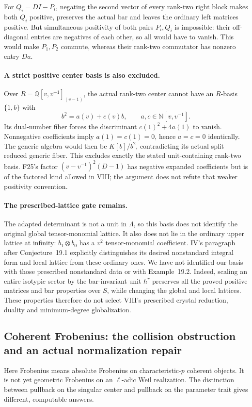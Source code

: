 \documentclass[11pt,a4paper]{article}
\newcommand{\Q}{\mathbb Q}\newcommand{\Z}{\mathbb Z}\newcommand{\C}{\mathbb C}\newcommand{\N}{\mathbb N}\newcommand{\F}{\mathbb F}
\theoremstyle{named}\newtheorem{finding}{Finding}[section]
\theoremstyle{definition}\newtheorem{definition}[finding]{Definition}
\theoremstyle{remark}\newtheorem{remark}[finding]{Remark}
\begin{document}
For $Q_i=DI-P_i$, negating the second vector of every rank-two
right block makes both $Q_i$ positive, preserves the actual bar
and leaves the ordinary left matrices positive.
But simultaneous positivity of both pairs $P_i,Q_i$ is impossible:
their off-diagonal entries are negatives of each other, so all
would have to vanish. This would make $P_1,P_2$ commute, whereas
their rank-two commutator has nonzero entry $Da$.

\paragraph{A strict positive center basis is also excluded.}
Over $R=\Q[v,v^{-1}]_{(v-1)}$, the actual rank-two center cannot
have an $R$-basis $\{1,b\}$ with
\[
 b^2=a(v)+c(v)b,\qquad a,c\in\N[v,v^{-1}].
\]
Its dual-number fiber forces the discriminant
$c(1)^2+4a(1)$ to vanish. Nonnegative coefficients imply
$a(1)=c(1)=0$, hence $a=c=0$ identically.
The generic algebra would then be $K[b]/b^2$, contradicting its
actual split reduced generic fiber. This excludes exactly the
stated unit-containing rank-two basis. F25's factor
$(v-v^{-1})^2(D-1)$ has negative expanded coefficients but is of
the factored kind allowed in VIII; the argument does not refute
that weaker positivity convention.

\paragraph{The prescribed-lattice gate remains.}
The adapted determinant is not a unit in $\Lambda$, so this basis
does not identify the original global tensor-monomial lattice.
It also does not lie in the ordinary upper lattice at infinity:
$b_1\otimes b_0$ has a $v^2$ tensor-monomial coefficient.
IV's paragraph after Conjecture~19.1 explicitly distinguishes its
desired nonstandard integral form and local lattice from these
ordinary ones. We have not identified our basis with those
prescribed nonstandard data or with Example~19.2.
Indeed, scaling an entire isotypic sector by the bar-invariant
unit $h^r$ preserves all the proved positive matrices and bar
properties over $S$, while changing the global and local lattices.
These properties therefore do not select VIII's prescribed
crystal reduction, duality and minimum-degree globalization.


\subsection{Coherent Frobenius: the collision obstruction and an actual normalization repair}
Here Frobenius means absolute Frobenius on characteristic-$p$ coherent
objects. It is not yet geometric Frobenius on an $\ell$-adic Weil
realization. The distinction between pullback on the singular center
and pullback on the parameter trait gives different, computable answers.
\end{document}
